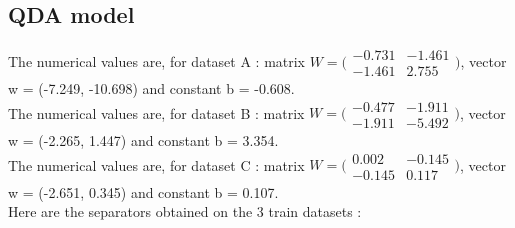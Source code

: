 \documentclass[11pt,a4paper]{article}
\begin{document}
\subsection{QDA model}
%

\hspace*{-6mm}The numerical values are, for dataset A :
matrix $W = 
\bigl(\begin{smallmatrix}
-0.731&-1.461\\ -1.461&2.755
\end{smallmatrix} \bigr)$, vector w = (-7.249, -10.698) and constant b = -0.608.
%
\\The numerical values are, for dataset B :
matrix $W = 
\bigl(\begin{smallmatrix}
-0.477&-1.911\\ -1.911&-5.492
\end{smallmatrix} \bigr)$, vector w = (-2.265, 1.447) and constant b = 3.354.
%
\\The numerical values are, for dataset C :
matrix $W = 
\bigl(\begin{smallmatrix}
0.002&-0.145\\ -0.145&0.117
\end{smallmatrix} \bigr)$, vector w = (-2.651, 0.345) and constant b = 0.107.
%
\\[5mm] Here are the separators obtained on the 3 train datasets : 
\end{document}
